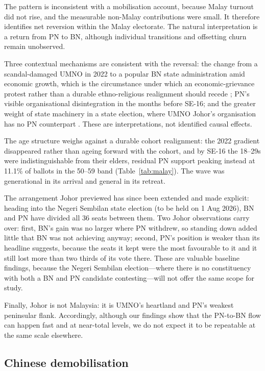 \documentclass[11pt]{article}
\begin{document}
The pattern is inconsistent with a mobilisation account, because Malay turnout did not rise, and the measurable non-Malay contributions were small. It therefore identifies net reversion within the Malay electorate. The natural interpretation is a return from PN to BN, although individual transitions and offsetting churn remain unobserved.

Three contextual mechanisms are consistent with the reversal: the change from a scandal-damaged UMNO in 2022 to a popular BN state administration amid economic growth, which is the circumstance under which an economic-grievance protest rather than a durable ethno-religious realignment should recede \cite{washida2023}; PN's visible organisational disintegration in the months before SE-16; and the greater weight of state machinery in a state election, where UMNO Johor's organisation has no PN counterpart \cite{ostwaldoliver2023}. These are interpretations, not identified causal effects.

The age structure weighs against a durable cohort realignment: the 2022 gradient disappeared rather than ageing forward with the cohort, and by SE-16 the 18--29s were indistinguishable from their elders, residual PN support peaking instead at 11.1\% of ballots in the 50--59 band (Table~\ref{tab:malay}). The wave was generational in its arrival and general in its retreat.

The arrangement Johor previewed has since been extended and made explicit: heading into the Negeri Sembilan state election (to be held on 1 Aug 2026), BN and PN have divided all 36 seats between them. Two Johor observations carry over: first, BN's gain was no larger where PN withdrew, so standing down added little that BN was not achieving anyway; second, PN's position is weaker than its headline suggests, because the seats it kept were the most favourable to it and it still lost more than two thirds of its vote there. These are valuable baseline findings, because the Negeri Sembilan election---where there is no constituency with both a BN and PN candidate contesting---will not offer the same scope for study.

Finally, Johor is not Malaysia: it is UMNO's heartland and PN's weakest peninsular flank. Accordingly, although our findings show that the PN-to-BN flow can happen fast and at near-total levels, we do not expect it to be repeatable at the same scale elsewhere.

\subsection{Chinese demobilisation}
\label{sec:findings-chinese}
\end{document}
